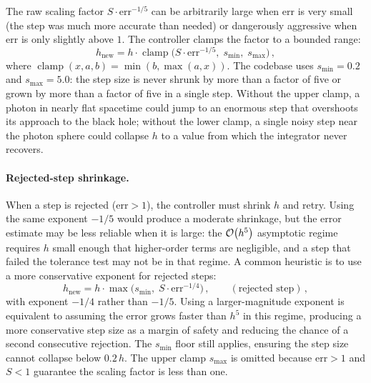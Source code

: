 The raw scaling factor $S \cdot \mathrm{err}^{-1/5}$ can be
arbitrarily large when $\mathrm{err}$ is very small (the step was much
more accurate than needed) or dangerously aggressive when
$\mathrm{err}$ is only slightly above $1$.  The controller clamps the
factor to a bounded range:
%
\begin{equation}
  h_{\text{new}} = h \cdot
  \operatorname{clamp}\!\bigl(S \cdot \mathrm{err}^{-1/5},\;
    s_{\min},\; s_{\max}\bigr) \,,
  \label{eq:rk-clamp}
\end{equation}
%
where $\operatorname{clamp}(x, a, b) = \min(b, \max(a, x))$.  The
codebase uses $s_{\min} = 0.2$ and $s_{\max} = 5.0$: the step size is
never shrunk by more than a factor of five or grown by more than a
factor of five in a single step.  Without the upper clamp, a photon in
nearly flat spacetime could jump to an enormous step that overshoots
its approach to the black hole; without the lower clamp, a single
noisy step near the photon sphere could collapse $h$ to a value from
which the integrator never recovers.

\paragraph{Rejected-step shrinkage.}

When a step is rejected ($\mathrm{err} > 1$), the controller must
shrink $h$ and retry.  Using the same exponent $-1/5$ would produce a
moderate shrinkage, but the error estimate may be less reliable when
it is large: the $\mathcal{O}\!\left(h^5\right)$ asymptotic regime requires $h$ small
enough that higher-order terms are negligible, and a step that failed
the tolerance test may not be in that regime.  A common heuristic is
to use a more conservative exponent for rejected steps:
%
\begin{equation}
  h_{\text{new}} = h \cdot
  \max\bigl(s_{\min},\;
    S \cdot \mathrm{err}^{-1/4}\bigr) \,,
  \qquad (\text{rejected step}) \,,
  \label{eq:rk-reject}
\end{equation}
%
with exponent $-1/4$ rather than $-1/5$.  Using a larger-magnitude
exponent is equivalent to assuming the error grows faster than $h^5$
in this regime, producing a more conservative step size as a margin of
safety and reducing the chance of a second consecutive rejection.  The
$s_{\min}$ floor still applies, ensuring the step size cannot collapse
below $0.2\,h$.  The upper clamp $s_{\max}$ is omitted because
$\mathrm{err} > 1$ and $S < 1$ guarantee the scaling factor is less
than one.


